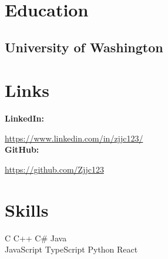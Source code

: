 \documentclass[]{deedy-resume-openfont}
\begin{document}
%
%

%
%

%
%

\begin{minipage}[t]{0.33\textwidth} 


\section{Education} 

\subsection{University of Washington}
\sectionsep




\section{Links} 
\textbf{LinkedIn:} 

\href{https://www.linkedin.com/in/zjjc123/}{https://www.linkedin.com/in/zjjc123/} \\
\textbf{GitHub:} 

\href{https://github.com/Zjjc123}{https://github.com/Zjjc123} \\



\section{Skills}

C \textbullet{}   C++ \textbullet{} C\# \textbullet{} Java \\
JavaScript \textbullet{} TypeScript \textbullet{} Python \textbullet{} React


\end{minipage}
\end{document}
